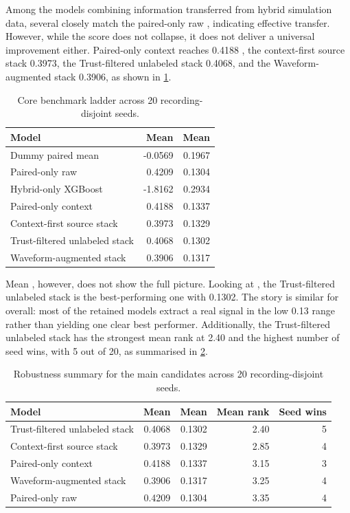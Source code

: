 Among the models combining information transferred from hybrid simulation data, several closely match the paired-only raw \rsq{}, indicating effective transfer. However, while the score does not collapse, it does not deliver a universal improvement either. Paired-only context reaches 0.4188 \rsq{}, the context-first source stack 0.3973, the Trust-filtered unlabeled stack 0.4068, and the Waveform-augmented stack 0.3906, as shown in \cref{tab:fpos-core-benchmark}.

\begin{table}[H]
    \centering
    \caption{Core \fpos{} benchmark ladder across 20 recording-disjoint seeds.}
    \label{tab:fpos-core-benchmark}
    \begin{tabular}{lrr}
        \toprule
        Model & Mean \rsq{} & Mean \mae{} \\
        \midrule
        Dummy paired mean & -0.0569 & 0.1967 \\
        Paired-only raw & 0.4209 & 0.1304 \\
        Hybrid-only XGBoost \parencite{ChenGuestrin2016} & -1.8162 & 0.2934 \\
        Paired-only context & 0.4188 & 0.1337 \\
        Context-first source stack & 0.3973 & 0.1329 \\
        Trust-filtered unlabeled stack & 0.4068 & 0.1302 \\
        Waveform-augmented stack & 0.3906 & 0.1317 \\
        \bottomrule
    \end{tabular}
\end{table}

Mean \rsq{}, however, does not show the full picture. Looking at \mae{}, the Trust-filtered unlabeled stack is the best-performing one with 0.1302. The story is similar for \mae{} overall: most of the retained models extract a real signal in the low 0.13 range rather than yielding one clear best performer. Additionally, the Trust-filtered unlabeled stack has the strongest mean rank at 2.40 and the highest number of seed wins, with 5 out of 20, as summarised in \cref{tab:fpos-robustness}.

\begin{table}[H]
    \centering
    \caption{Robustness summary for the main \fpos{} candidates across 20 recording-disjoint seeds.}
    \label{tab:fpos-robustness}
    \begin{tabular}{lrrrr}
        \toprule
        Model & Mean \rsq{} & Mean \mae{} & Mean rank & Seed wins \\
        \midrule
        Trust-filtered unlabeled stack & 0.4068 & 0.1302 & 2.40 & 5 \\
        Context-first source stack & 0.3973 & 0.1329 & 2.85 & 4 \\
        Paired-only context & 0.4188 & 0.1337 & 3.15 & 3 \\
        Waveform-augmented stack & 0.3906 & 0.1317 & 3.25 & 4 \\
        Paired-only raw & 0.4209 & 0.1304 & 3.35 & 4 \\
        \bottomrule
    \end{tabular}
\end{table}

